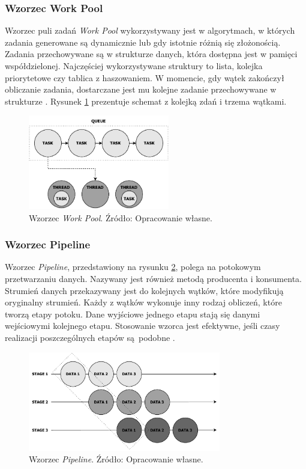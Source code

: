 \documentclass[12pt]{article}
\begin{document}
\subsubsection{Wzorzec Work Pool}\label{work-pool}
Wzorzec puli zadań \textit{Work Pool} wykorzystywany jest w algorytmach, w których zadania generowane są dynamicznie
lub gdy istotnie różnią się złożonością. Zadania przechowywane są w strukturze danych, która dostępna
jest w pamięci współdzielonej. Najczęściej wykorzystywane struktury to lista, kolejka priorytetowe
czy tablica z haszowaniem. W momencie, gdy wątek zakończył obliczanie zadania, dostarczane jest mu
kolejne zadanie przechowywane w strukturze \cite{wprowadzenie-do-obliczen-rownoleglych}.
Rysunek \ref{fig:work-pool} prezentuje schemat z kolejką zdań i trzema wątkami.

\begin{figure}[H]
    \centering
	\includegraphics[width=0.55\textwidth]{patterns-work-pool.pdf}
    \caption{Wzorzec \textit{Work Pool}. Źródło: Opracowanie własne.}
    \label{fig:work-pool}
\end{figure}

\subsubsection{Wzorzec Pipeline}
Wzorzec \textit{Pipeline}, przedstawiony na rysunku \ref{fig:pipeline}, polega na potokowym przetwarzaniu danych. Nazywany jest również metodą producenta
i konsumenta. Strumień danych przekazywany jest do kolejnych wątków, które modyfikują oryginalny strumień.
Każdy z wątków wykonuje inny rodzaj obliczeń, które tworzą etapy potoku. Dane wyjściowe jednego etapu
stają się danymi wejściowymi kolejnego etapu. Stosowanie wzorca jest efektywne, jeśli czasy realizacji
poszczególnych etapów są~podobne \cite{wprowadzenie-do-obliczen-rownoleglych}.

\begin{figure}[H]
    \centering
	\includegraphics[width=0.75\textwidth]{patterns-pipeline.pdf}
    \caption{Wzorzec \textit{Pipeline}. Źródło: Opracowanie własne.}
    \label{fig:pipeline}
\end{figure}
\end{document}
